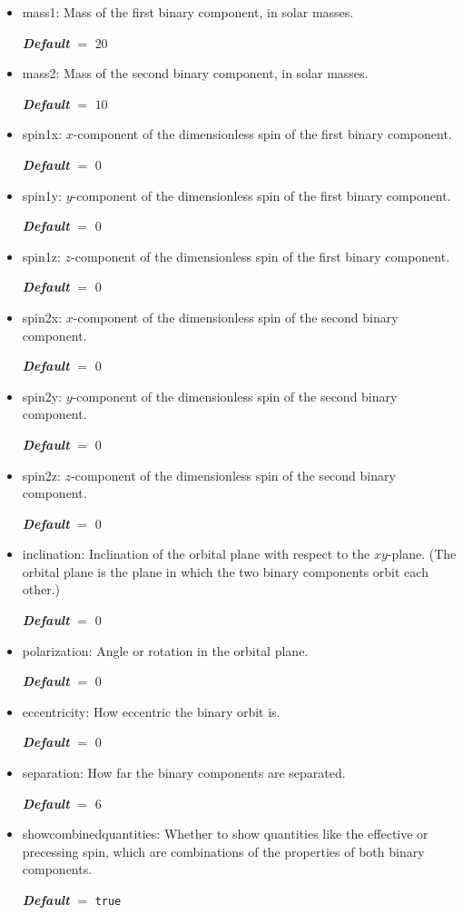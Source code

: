 \documentclass[
    DIV=11,
    BCOR=0mm,
    paper=a4,
    fontsize=11pt,
    twoside=false,
    titlepage=true
]{scrartcl}
\newcommand{\code}[1]{{\color{codecolor}\ttfamily#1}}  %
\newcommand{\defaultval}[1]{%
    {\bfseries\slshape%
    Default} $=$ \texttt{#1}%
}
\begin{document}
\begin{itemize}

    \item \code{mass1}: Mass of the first binary component, in solar masses.

    \defaultval{$20$}


    \item \code{mass2}: Mass of the second binary component, in solar masses.

    \defaultval{$10$}


    \item \code{spin1x}: $x$-component of the dimensionless spin of the first binary component.

    \defaultval{$0$}


    \item \code{spin1y}: $y$-component of the dimensionless spin of the first binary component.

    \defaultval{$0$}


    \item \code{spin1z}: $z$-component of the dimensionless spin of the first binary component.

    \defaultval{$0$}


    \item \code{spin2x}: $x$-component of the dimensionless spin of the second binary component.

    \defaultval{$0$}


    \item \code{spin2y}: $y$-component of the dimensionless spin of the second binary component.

    \defaultval{$0$}


    \item \code{spin2z}: $z$-component of the dimensionless spin of the second binary component.

    \defaultval{$0$}


	\item \code{inclination}: Inclination of the orbital plane with respect to the $xy$-plane. (The orbital plane is the plane in which the two binary components orbit each other.)

    \defaultval{$0$}


	\item \code{polarization}: Angle or rotation in the orbital plane.

    \defaultval{$0$}


    \item \code{eccentricity}: How eccentric the binary orbit is.

    \defaultval{$0$}


    \item \code{separation}: How far the binary components are separated.

    \defaultval{$6$}


    \item \code{showcombinedquantities}: Whether to show quantities like the effective or precessing spin, which are combinations of the properties of both binary components.

    \defaultval{true}
\end{itemize}
\end{document}
